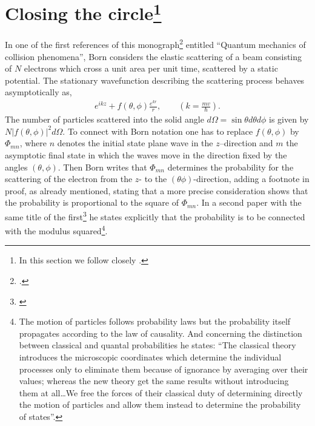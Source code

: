 \section[Closing the circle]{Closing the circle\footnote{In this section we follow closely \cite{Pais:86}.}}\label{S7.6.4}
In one of the first references of this monograph\footnote{\cite{Born:26}.} entitled ``Quantum mechanics of collision phenomena'', Born considers the elastic scattering of a beam consisting of $N$ electrons which cross a unit area per unit time, scattered by a static potential. The stationary wavefunction describing the scattering process behaves asymptotically as,
\begin{align}\label{eq7.4.2}
e^{ikz}+f(\theta,\phi)\frac{e^{kr}}{r},\quad\quad \left(k=\frac{mv}{\hbar}\right).
\end{align}
The number of particles scattered into the solid angle $d\Omega=\sin\theta d\theta d\phi$ is given by $N|f(\theta,\phi)|^2d\Omega$. To connect with Born notation one has to replace $f(\theta,\phi)$ by $\Phi_{mn}$, where $n$ denotes the initial state plane wave in the $z$--direction and $m$ the asymptotic final state in which the waves move in the direction fixed by the angles $(\theta,\phi)$. Then Born writes that $\Phi_{mn}$ determines the probability for the scattering of the electron from the $z$- to the $(\theta\phi)$-direction, adding a footnote in proof, as already mentioned, stating that a more precise consideration shows that the probability is proportional to the square of $\Phi_{mn}$. In a second paper with the same title of the first\footnote{\cite{Born:26b}} he states explicitly that the probability is to be connected with the modulus squared\footnote{The motion of particles follows probability laws but the probability itself propagates according to the law of causality. And concerning the distinction between classical and quantal probabilities he states: ``The classical theory introduces the microscopic coordinates which determine the individual processes only to eliminate them because of ignorance by averaging over their values; whereas the new theory get the same results without introducing them at all\dots We free the forces of their classical duty of determining directly the motion of particles and allow them instead to determine the probability of states''.}. 

